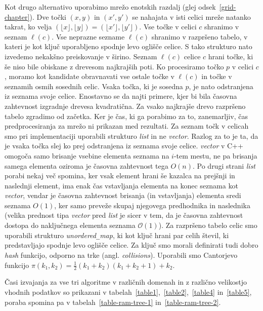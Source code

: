 \documentclass[a4paper, 12pt]{book}
\newcommand{\OO}{\ensuremath{\mathcal{O}}} %
\newcommand{\U}{\texttt{\_}}
\begin{document}
Kot drugo alternativo uporabimo mrežo enotskih razdalj (glej odsek~\ref{grid-chapter}). Dve točki $(x,y)$ in $(x',y')$ se nahajata v isti celici mreže natanko takrat, ko velja $(\lfloor x\rfloor ,\lfloor y\rfloor)=(\lfloor x'\rfloor ,\lfloor y'\rfloor)$. Vse točke v celici $c$ shranimo v seznam $\ell(c)$. Vse neprazne sezname $\ell(c)$ shranimo v razpršeno tabelo, v kateri je kot ključ uporabljeno spodnje levo oglišče celice. S tako strukturo nato izvedemo nekakšno preiskovanje v širino. Seznam $\ell(c)$ celice $c$ hrani točke, ki še niso bile obiskane z drevesom najkrajših poti. Ko procesiramo točko $p$ v celici $c$, moramo kot kandidate obravnavati vse ostale točke v $\ell(c)$ in točke v seznamih osmih sosednih celic. Vsaka točka, ki je sosedna $p$, je nato odstranjena iz seznama svoje celice. Enostavno se da najti primere, kjer bi bila časovna zahtevnost izgradnje drevesa kvadratična. Za vsako najkrajše drevo razpršeno tabelo zgradimo od začetka. Ker je čas, ki ga porabimo za to, zanemarljiv, čas predprocesiranja za mrežo ni prikazan med rezultati. Za seznam točk v celicah smo pri implementaciji uporabili strukturo \textit{list} in ne \textit{vector}. Razlog za to je ta, da je vsaka točka slej ko prej odstranjena iz seznama svoje celice. \textit{vector} v C++ omogoča samo brisanje vsebine elementa seznama na $i$-tem mestu, ne pa brisanja samega elementa oziroma je časovna zahtevnost tega $O(n)$. Po drugi strani \textit{list} porabi nekaj več spomina, ker vsak element hrani še kazalca na prejšnji in naslednji element, ima enak čas vstavljanja elementa na konec seznama kot \textit{vector}, vendar je časovna zahtevnost brisanja (in vstavljanja) elementa sredi seznama $O(1)$, ker samo preveže skupaj njegovega predhodnika in naslednika (velika prednost tipa \textit{vector} pred \textit{list} je sicer v tem, da je časovna zahtevnost dostopa do naključnega elementa seznama $\OO(1)$). Za razpršeno tabelo celic smo uporabili strukturo \textit{unordered\U map}, ki kot ključ hrani par celih števil, ki predstavljajo spodnje levo oglišče celice. Za ključ smo morali definirati tudi dobro \textit{hash} funkcijo, odporno na trke (angl. \textit{collisions}). Uporabili smo Cantorjevo funkcijo $\pi (k_1, k_2) = \frac{1}{2}(k_1+k_2)(k_1+k_2+1) + k_2$.

Časi izvajanja za vse tri algoritme v različnih domenah in z različno velikostjo vhodnih podatkov so prikazani v tabelah~\ref{table1},~\ref{table2},~\ref{table4} in~\ref{table5}, poraba spomina pa v tabelah~\ref{table-ram-tree-1} in~\ref{table-ram-tree-2}.
\end{document}
